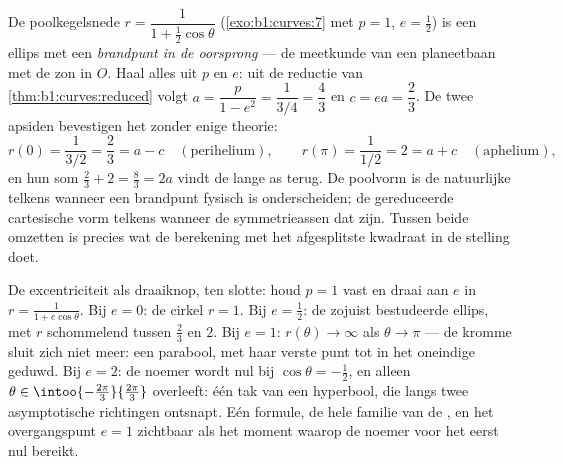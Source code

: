 \begin{example}
\label{ex:b1:curves:orbit}
De poolkegelsnede $r = \dfrac{1}{1 + \frac12\cos\theta}$
(\cref{exo:b1:curves:7} met $p = 1$, $e = \frac12$) is een ellips
met een \emph{brandpunt in de oorsprong} --- de meetkunde van een
planeetbaan met de zon in $O$. Haal alles uit $p$ en $e$: uit de
reductie van \cref{thm:b1:curves:reduced} volgt $a = \dfrac{p}{1 -
e^2} = \dfrac{1}{3/4} = \dfrac43$ en $c = ea = \dfrac23$. De twee
apsiden bevestigen het zonder enige theorie:
\[
r(0) = \frac{1}{3/2} = \frac23 = a - c
\quad (\text{perihelium}),
\qquad
r(\pi) = \frac{1}{1/2} = 2 = a + c
\quad (\text{aphelium}),
\]
en hun som $\frac23 + 2 = \frac83 = 2a$ vindt de lange as terug.
De poolvorm is de natuurlijke telkens wanneer een brandpunt fysisch
is onderscheiden; de gereduceerde cartesische vorm telkens wanneer
de symmetrieassen dat zijn. Tussen beide omzetten is precies wat de
berekening met het afgesplitste kwadraat in de stelling doet.

De excentriciteit als draaiknop, ten slotte: houd $p = 1$ vast en
draai aan $e$ in $r = \frac{1}{1 + e\cos\theta}$. Bij $e = 0$: de
cirkel $r = 1$. Bij $e = \frac12$: de zojuist bestudeerde ellips,
met $r$ schommelend tussen $\frac23$ en $2$. Bij $e = 1$: $r(\theta)
\to \infty$ als $\theta \to \pi$ --- de kromme sluit zich niet
meer: een parabool, met haar verste punt tot in het oneindige
geduwd. Bij $e = 2$: de noemer wordt nul bij $\cos\theta =
-\frac12$, en alleen $\theta \in
\intoo{-\frac{2\pi}3}{\frac{2\pi}3}$ overleeft: één tak van een
hyperbool, die langs twee asymptotische richtingen ontsnapt. Eén
formule, de hele familie van de , en het overgangspunt
$e = 1$ zichtbaar als het moment waarop de noemer voor het eerst
nul bereikt.
\end{example}

